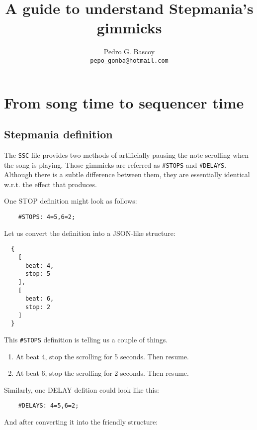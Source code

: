 \documentclass[a4paper,9pt]{article}
\begin{document}
    
    \title{A guide to understand Stepmania's gimmicks}
    \author{
        Pedro G. Bascoy\\
        \texttt{pepo\_gonba@hotmail.com}\\
    }
    \maketitle
   
    \section{From song time to sequencer time}
    \subsection{Stepmania definition}

    The \texttt{SSC} file provides two methods of artificially pausing the note scrolling when the song is playing. Those gimmicks are referred as \texttt{\#STOPS} and \texttt{\#DELAYS}. Although there is a subtle difference between them, they are essentially identical w.r.t. the effect that produces.

One STOP definition might look as follows:

\begin{verbatim}
    #STOPS: 4=5,6=2;
\end{verbatim}

Let us convert the definition into a JSON-like structure:

    \begin{verbatim}
  {
    [
      beat: 4,
      stop: 5 
    ],
    [
      beat: 6,
      stop: 2 
    ]
  }
    \end{verbatim}

    This \texttt{\#STOPS} definition is telling us a couple of things.
    \begin{enumerate}
	    \item At beat 4, stop the scrolling for 5 seconds. Then resume.
	    \item At beat 6, stop the scrolling for 2 seconds. Then resume.
    \end{enumerate}

Similarly, one DELAY defition could look like this:
\begin{verbatim}
    #DELAYS: 4=5,6=2;
\end{verbatim}

And after converting it into the friendly structure:
\end{document}
